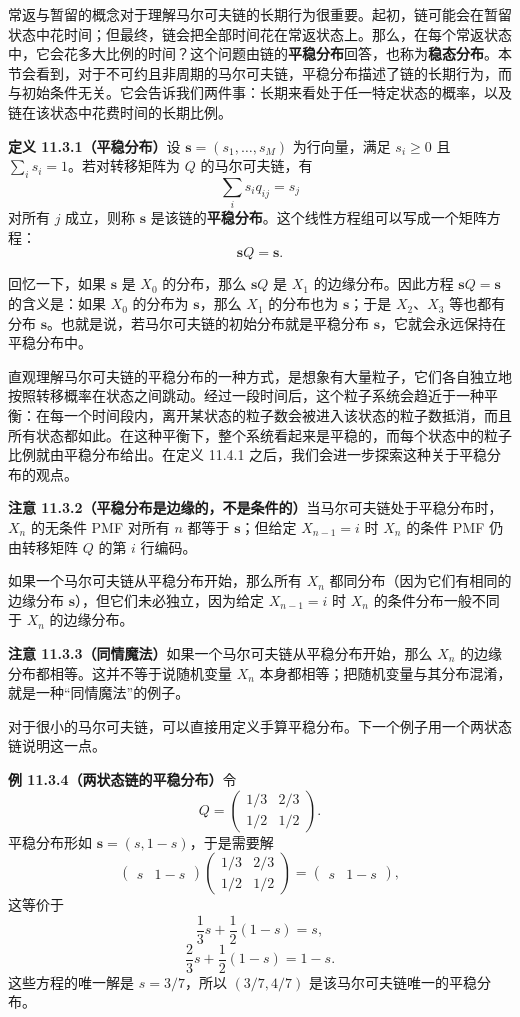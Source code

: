 \documentclass[UTF8, 12pt, fontset=fandol, oneside]{ctexart}
\begin{document}
常返与暂留的概念对于理解马尔可夫链的长期行为很重要。起初，链可能会在暂留状态中花时间；但最终，链会把全部时间花在常返状态上。那么，在每个常返状态中，它会花多大比例的时间？这个问题由链的\textbf{平稳分布}回答，也称为\textbf{稳态分布}。本节会看到，对于不可约且非周期的马尔可夫链，平稳分布描述了链的长期行为，而与初始条件无关。它会告诉我们两件事：长期来看处于任一特定状态的概率，以及链在该状态中花费时间的长期比例。

\noindent\textbf{定义 11.3.1（平稳分布）}\quad 设 $\mathbf s=(s_1,\ldots,s_M)$ 为行向量，满足 $s_i\ge0$ 且 $\sum_i s_i=1$。若对转移矩阵为 $Q$ 的马尔可夫链，有
\[
  \sum_i s_i q_{ij}=s_j
\]
对所有 $j$ 成立，则称 $\mathbf s$ 是该链的\textbf{平稳分布}。这个线性方程组可以写成一个矩阵方程：
\[
  \mathbf sQ=\mathbf s.
\]

回忆一下，如果 $\mathbf s$ 是 $X_0$ 的分布，那么 $\mathbf sQ$ 是 $X_1$ 的边缘分布。因此方程 $\mathbf sQ=\mathbf s$ 的含义是：如果 $X_0$ 的分布为 $\mathbf s$，那么 $X_1$ 的分布也为 $\mathbf s$；于是 $X_2$、$X_3$ 等也都有分布 $\mathbf s$。也就是说，若马尔可夫链的初始分布就是平稳分布 $\mathbf s$，它就会永远保持在平稳分布中。

直观理解马尔可夫链的平稳分布的一种方式，是想象有大量粒子，它们各自独立地按照转移概率在状态之间跳动。经过一段时间后，这个粒子系统会趋近于一种平衡：在每一个时间段内，离开某状态的粒子数会被进入该状态的粒子数抵消，而且所有状态都如此。在这种平衡下，整个系统看起来是平稳的，而每个状态中的粒子比例就由平稳分布给出。在定义 11.4.1 之后，我们会进一步探索这种关于平稳分布的观点。

\noindent\textbf{注意 11.3.2（平稳分布是边缘的，不是条件的）}\quad 当马尔可夫链处于平稳分布时，$X_n$ 的无条件 PMF 对所有 $n$ 都等于 $\mathbf s$；但给定 $X_{n-1}=i$ 时 $X_n$ 的条件 PMF 仍由转移矩阵 $Q$ 的第 $i$ 行编码。

如果一个马尔可夫链从平稳分布开始，那么所有 $X_n$ 都同分布（因为它们有相同的边缘分布 $\mathbf s$），但它们未必独立，因为给定 $X_{n-1}=i$ 时 $X_n$ 的条件分布一般不同于 $X_n$ 的边缘分布。

\noindent\textbf{注意 11.3.3（同情魔法）}\quad 如果一个马尔可夫链从平稳分布开始，那么 $X_n$ 的边缘分布都相等。这并不等于说随机变量 $X_n$ 本身都相等；把随机变量与其分布混淆，就是一种“同情魔法”的例子。

对于很小的马尔可夫链，可以直接用定义手算平稳分布。下一个例子用一个两状态链说明这一点。

\noindent\textbf{例 11.3.4（两状态链的平稳分布）}\quad 令
\[
  Q=
  \begin{pmatrix}
    1/3 & 2/3\\
    1/2 & 1/2
  \end{pmatrix}.
\]
平稳分布形如 $\mathbf s=(s,1-s)$，于是需要解
\[
  \begin{pmatrix}s&1-s\end{pmatrix}
  \begin{pmatrix}
    1/3 & 2/3\\
    1/2 & 1/2
  \end{pmatrix}
  =
  \begin{pmatrix}s&1-s\end{pmatrix},
\]
这等价于
\[
  \frac13s+\frac12(1-s)=s,
\]
\[
  \frac23s+\frac12(1-s)=1-s.
\]
这些方程的唯一解是 $s=3/7$，所以 $(3/7,4/7)$ 是该马尔可夫链唯一的平稳分布。
\end{document}

